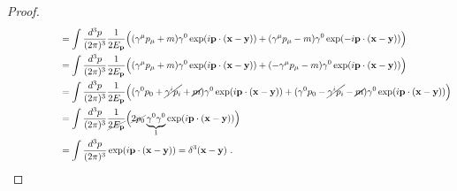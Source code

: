\begin{proof}
\begin{equation*}
\begin{aligned}
            \phantom{[\hat \psi(\mathbf x), \hat \psi^\dagger (\mathbf y)]} & = \int \frac{d^3 p}{(2 \pi)^3} \frac{1}{2 E_{\mathbf p}} \Big ( (\gamma^\mu p_\mu + m) \gamma^0 \exp (i \mathbf p \cdot (\mathbf x - \mathbf y)) + (\gamma^\mu p_\mu - m) \gamma^0 \exp (- i \mathbf p  \cdot (\mathbf x - \mathbf y)) \Big)  \\ & = \int \frac{d^3 p}{(2 \pi)^3} \frac{1}{2 E_{\mathbf p}} \Big ( (\gamma^\mu p_\mu + m) \gamma^0 \exp (i \mathbf p \cdot (\mathbf x - \mathbf y)) + (-\gamma^\mu p_\mu - m) \gamma^0 \exp (i \mathbf p  \cdot (\mathbf x - \mathbf y)) \Big) \\ & = \int \frac{d^3 p}{(2 \pi)^3} \frac{1}{2 E_{\mathbf p}} \Big ( (\gamma^0 p_0 + \cancel{\gamma^i p_i} + \cancel{m}) \gamma^0 \exp (i \mathbf p \cdot (\mathbf x - \mathbf y)) + (\gamma^0 p_0 - \cancel{\gamma^i p_i} - \cancel{m}) \gamma^0 \exp (i \mathbf p  \cdot (\mathbf x - \mathbf y)) \Big) \\ & = \int \frac{d^3 p}{(2 \pi)^3} \frac{1}{\cancel{2 E_{\mathbf p}}} \Big (\cancel{2 p_0} \underbrace{\gamma^0 \gamma^0}_1 \exp (i \mathbf p \cdot (\mathbf x - \mathbf y)) \Big) \\ & = \int \frac{d^3 p}{(2 \pi)^3} \exp (i \mathbf p \cdot (\mathbf x - \mathbf y)) = \delta^3 (\mathbf x - \mathbf y) ~.
        \end{aligned}
        \end{equation*} 
    \end{proof}

